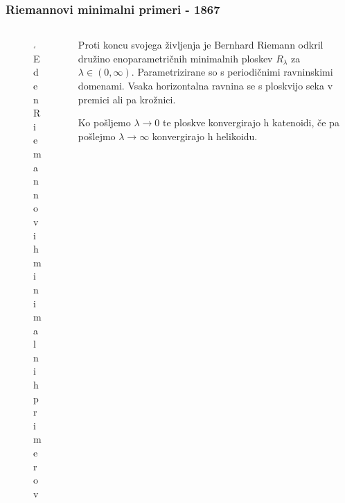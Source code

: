 \documentclass[8pt]{beamer}
\theoremstyle{definition}
\theoremstyle{remark}
\theoremstyle{plain}
\numberwithin{equation}{section}  %
\begin{document}
\begin{frame}
    \frametitle{Riemannovi minimalni primeri - 1867}

    \begin{columns}
        \begin{column}{0.4\textwidth}
            \centering
            \begin{figure}
                \includegraphics[width=16em]{../Slike/Riemann_Minimal_Example.png}
                \caption{Eden Riemannovih minimalnih primerov}
            \end{figure}
        \end{column}

        \begin{column}{0.6\textwidth}
            Proti koncu svojega življenja je Bernhard Riemann odkril družino enoparametričnih minimalnih ploskev $R_\lambda$ za $\lambda \in (0, \infty)$. Parametrizirane so s periodičnimi ravninskimi domenami. Vsaka horizontalna ravnina se s ploskvijo seka v premici ali pa krožnici. 
            
            \vspace{0.8em}

            Ko pošljemo $\lambda \rightarrow 0$ te ploskve konvergirajo h katenoidi, če pa pošlejmo $\lambda \rightarrow \infty$ konvergirajo h helikoidu.         \end{column}
    \end{columns}
    
\end{frame}
\end{document}
